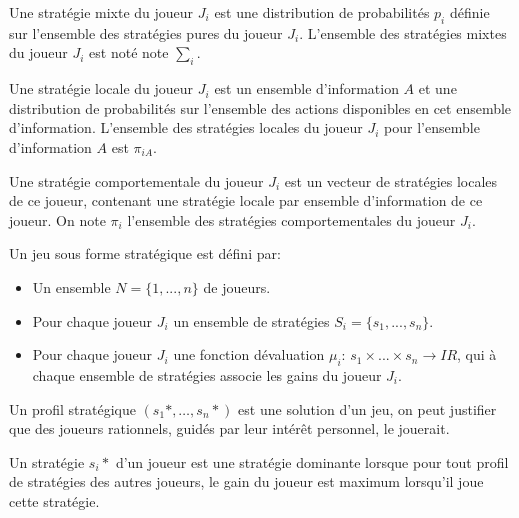 \begin{definition}
	Une stratégie mixte du joueur $J_i$ est une distribution de probabilités $p_i$ définie sur l’ensemble des stratégies pures du joueur $J_i$. L’ensemble des stratégies mixtes du joueur $J_i$  est noté note $\sum_i$.
\end{definition}

\begin{definition}
	Une stratégie locale du joueur $J_i$ est un ensemble d’information $A$ et une distribution de probabilités sur l’ensemble des actions disponibles en cet ensemble d’information. L’ensemble des stratégies locales du joueur $J_i$ pour l’ensemble d’information $A$  est $\pi_{iA}$.
\end{definition}

\begin{definition}
	Une stratégie comportementale du joueur $J_i$ est un vecteur de stratégies locales de ce joueur, contenant une stratégie locale par ensemble d’information de ce joueur. On note $\pi_i$ l’ensemble des stratégies comportementales du joueur $J_i$.
\end{definition}

\begin{definition}
	Un jeu sous forme stratégique est défini par:
	\begin{itemize}
		\item Un ensemble $N = \{1, . . ., n\}$ de joueurs.
		\item Pour chaque joueur $J_i$ un ensemble de stratégies $ S_i = \{s_1, . . ., s_n\}$.
		\item Pour chaque joueur  $J_i$ une fonction dévaluation $\mu_i$: $s_1 \times . . . \times s_n \longrightarrow IR$, qui à chaque ensemble de stratégies associe les gains du joueur $J_i$.
	\end{itemize}
\end{definition}

\begin{definition}
	Un profil stratégique $(s_1*, …, s_n*)$ est une solution d’un jeu, on peut justifier que des joueurs rationnels, guidés par leur intérêt personnel, le jouerait.
\end{definition}

\begin{definition}
	Un stratégie $s_i*$ d’un joueur est une stratégie dominante lorsque pour tout profil de stratégies des autres joueurs, le gain du joueur est maximum lorsqu’il joue cette stratégie.
\end{definition}

